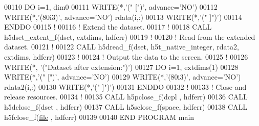 \begin{DoxyCode}
00110   \textcolor{keywordflow}{DO} i=1, dim0
00111      \textcolor{keyword}{WRITE}(*,\textcolor{stringliteral}{'(" [")'}, advance=\textcolor{stringliteral}{'NO'})
00112      \textcolor{keyword}{WRITE}(*,\textcolor{stringliteral}{'(80i3)'}, advance=\textcolor{stringliteral}{'NO'}) rdata(i,:)
00113      \textcolor{keyword}{WRITE}(*,\textcolor{stringliteral}{'(" ]")'})
00114 \textcolor{keywordflow}{  ENDDO}
00115   \textcolor{comment}{!}
00116   \textcolor{comment}{! Extend the dataset.}
00117   \textcolor{comment}{!}
00118   \textcolor{keyword}{CALL }h5dset\_extent\_f(dset, extdims, hdferr)
00119   \textcolor{comment}{!}
00120   \textcolor{comment}{! Read from the extended dataset.}
00121   \textcolor{comment}{!}
00122   \textcolor{keyword}{CALL }h5dread\_f(dset, h5t\_native\_integer, rdata2, extdims, hdferr)
00123   \textcolor{comment}{!}
00124   \textcolor{comment}{! Output the data to the screen.}
00125   \textcolor{comment}{!}
00126   \textcolor{keyword}{WRITE}(*, \textcolor{stringliteral}{'("Dataset after extension:")'})
00127   \textcolor{keywordflow}{DO} i=1, extdims(1)
00128      \textcolor{keyword}{WRITE}(*,\textcolor{stringliteral}{'(" [")'}, advance=\textcolor{stringliteral}{'NO'})
00129      \textcolor{keyword}{WRITE}(*,\textcolor{stringliteral}{'(80i3)'}, advance=\textcolor{stringliteral}{'NO'}) rdata2(i,:)
00130      \textcolor{keyword}{WRITE}(*,\textcolor{stringliteral}{'(" ]")'})
00131 \textcolor{keywordflow}{  ENDDO}
00132   \textcolor{comment}{!}
00133   \textcolor{comment}{! Close and release resources.}
00134   \textcolor{comment}{!}
00135   \textcolor{keyword}{CALL }h5pclose\_f(dcpl , hdferr)
00136   \textcolor{keyword}{CALL }h5dclose\_f(dset , hdferr)
00137   \textcolor{keyword}{CALL }h5sclose\_f(space, hdferr)
00138   \textcolor{keyword}{CALL }h5fclose\_f(\hyperlink{structfile}{file} , hdferr)
00139 
00140 \textcolor{keyword}{END PROGRAM }main
\end{DoxyCode}
